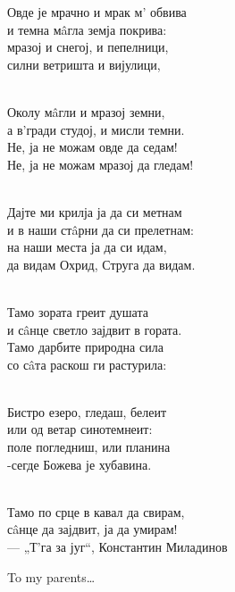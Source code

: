\cleardoublepage
\thispagestyle{empty}


\begin{raggedleft}
Овде је мрачно и мрак м' обвива \\
и темна мâгла земја покрива: \\
мразој и снегој, и пепелници, \\
силни ветришта и вијулици, \\
\

Околу мâгли и мразој земни, \\
а в’гради студој, и мисли темни. \\
Не, ја не можам овде да седам! \\
Не, ја не можам мразој да гледам! \\
\

Дајте ми крилја ја да си метнам \\
и в наши стâрни да си прелетнам: \\
на наши места ја да си идам, \\ 
да видам Охрид, Струга да видам. \\
\

Тамо зората греит душата \\
и сâнце светло зајдвит в гората. \\
Тамо дарбите природна сила \\
со сâта раскош ги растурила: \\
\

Бистро езеро, гледаш, белеит \\
или од ветар синотемнеит: \\
поле погледниш, или планина \\
-сегде Божева је хубавина. \\ 
\

Тамо по срце в кавал да свирам, \\
сâнце да зајдвит, ја да умирам! \\
     ---  „Т'га за југ“, Константин Миладинов\\
\end{raggedleft}



\begin{center}
    To my parents\dots
\end{center}



